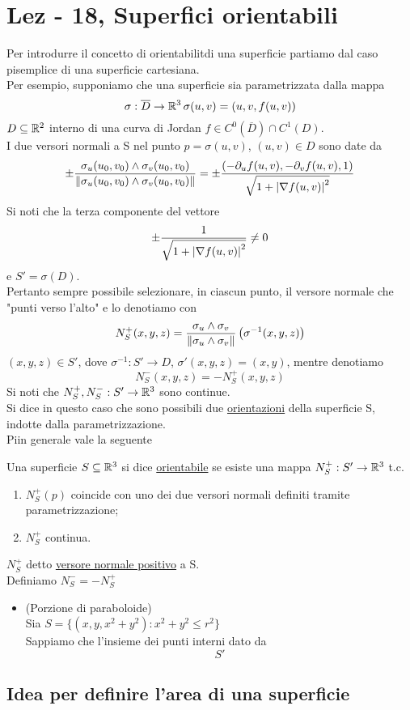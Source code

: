 \section{Lez - 18, Superfici orientabili}
Per introdurre il concetto di orientabilit\aca di una superficie
partiamo dal caso pi\acu semplice di una superficie cartesiana. \\
Per esempio, supponiamo che una superficie sia parametrizzata dalla mappa 
$$\sigma:\overline{D}\to\mathbb{R}^3 \, \sigma(u,v)=(u,v,f(u,v))$$
$D\subseteq \mathbb{R}^2$ interno di una curva di Jordan $f \in C^0(\overline{D})\cap C^1(D)$. \\
I due versori normali a S nel punto $p = \sigma(u,v)$, $(u,v)\in D$ sono date da 
$$\pm \frac{\sigma_u(u_0,v_0)\wedge\sigma_v(u_0,v_0)}
{\left\lVert\sigma_u(u_0,v_0)\wedge \sigma_v(u_0,v_0)\right\rVert} = \pm \frac{\left(-\partial_u f(u,v), -\partial_v f(u,v), 1\right)}
    {\sqrt{1+\left\lvert \nabla f(u,v) \right\rvert^2}}$$
Si noti che la terza componente del vettore 
$$\pm \frac{1}{\sqrt{1+\left\lvert \nabla f(u,v) \right\rvert^2}} \neq 0$$
e $S' = \sigma(D)$. \\
Pertanto \ace sempre possibile selezionare, in ciascun punto, il versore normale che 
"punti verso l'alto" e lo denotiamo con 
$$N_S^{+} (x,y,z) = \frac{\sigma_u\wedge \sigma_v}{\left\lVert\sigma_u\wedge\sigma_v\right\rVert}\left(\sigma^{-1}(x,y,z)\right)$$
$(x,y,z)\in S'$, dove $\sigma^{-1}:S'\to D$, $\sigma'(x,y,z) = (x,y)$, mentre 
denotiamo 
$$N_S^{-} (x,y,z) = - N_S^{+} (x,y,z)$$
Si noti che $N_S^{+}, N_S^{-}: S' \to \mathbb{R}^3$ sono continue. \\
Si dice in questo caso che sono possibili due \underline{orientazioni} della superficie S, indotte
dalla parametrizzazione. \\
Pi\acu in generale vale la seguente
\begin{definition}
  Una superficie $S\subseteq\mathbb{R}^3$ si dice \underline{orientabile} se esiste una mappa 
  $N_S^{+} : S'\to\mathbb{R}^3$ t.c. 
  \begin{enumerate}
    \item $N_S^{+}(p)$ coincide con uno dei due versori normali definiti tramite parametrizzazione;
    \item $N_S^{+}$ \ace continua.  
  \end{enumerate}
  $N_S^{+}$ \ace detto \underline{versore normale positivo} a S. \\
  Definiamo $N_S^{-} = - N_S^{+}$
\end{definition} 
\begin{example}
  \begin{itemize}
    \item (Porzione di paraboloide) \\
          Sia $S=\{(x,y,x^2+y^2): x^2+y^2\leq r^2\}$ \\
          Sappiamo che l'insieme dei punti interni \ace dato da 
          $$S'$$
  \end{itemize}
\end{example}
\subsection{Idea per definire l'area di una superficie}
